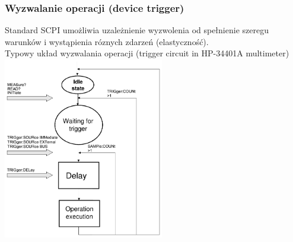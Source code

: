 \subsubsection{Wyzwalanie operacji (device trigger)}
Standard SCPI umożliwia uzależnienie wyzwolenia od spełnienie szeregu warunków i wystąpienia róznych zdarzeń (elastyczność).\\
Typowy układ wyzwalania operacji (trigger circuit in HP-34401A multimeter)\\
\includegraphics[width=7cm]{./wyklady/IEEE488_SCPI_39_1.pdf}
